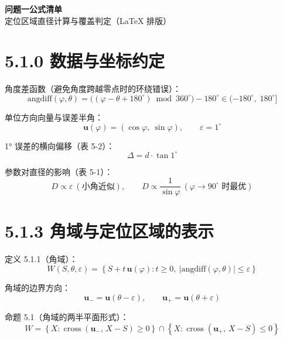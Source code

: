\documentclass[11pt]{ctexart}
\begin{document}
\begin{center}
{\LARGE\bfseries 问题一公式清单}\\[6pt]
{\normalsize 定位区域直径计算与覆盖判定（LaTeX 排版）}
\end{center}

\section*{5.1.0 数据与坐标约定}

角度差函数（避免角度跨越零点时的环绕错误）：
\begin{equation}
\mathrm{angdiff}(\varphi,\theta)
= \big((\varphi-\theta+180^\circ) \bmod 360^\circ\big) - 180^\circ
\in (-180^\circ,\; 180^\circ]
\end{equation}

单位方向向量与误差半角：
\begin{equation}
\mathbf{u}(\varphi) = (\cos\varphi,\ \sin\varphi), \qquad
\varepsilon = 1^\circ
\end{equation}

1° 误差的横向偏移（表 5-2）：
\begin{equation}
\Delta = d \cdot \tan 1^\circ
\end{equation}

参数对直径的影响（表 5-1）：
\begin{equation}
D \propto \varepsilon \ (\text{小角近似}), \qquad
D \propto \frac{1}{\sin\varphi} \ (\varphi \to 90^\circ \text{ 时最优})
\end{equation}

\section*{5.1.3 角域与定位区域的表示}

定义 5.1.1（角域）：
\begin{equation}
W(S,\theta,\varepsilon)
= \left\{ S + t\,\mathbf{u}(\varphi) : t \ge 0,\ \bigl|\mathrm{angdiff}(\varphi,\theta)\bigr| \le \varepsilon \right\}
\end{equation}

角域的边界方向：
\begin{equation}
\mathbf{u}_- = \mathbf{u}(\theta-\varepsilon), \qquad
\mathbf{u}_+ = \mathbf{u}(\theta+\varepsilon)
\end{equation}

命题 5.1（角域的两半平面形式）：
\begin{equation}
W = \left\{ X : \operatorname{cross}(\mathbf{u}_-,\, X-S) \ge 0 \right\}
\cap \left\{ X : \operatorname{cross}(\mathbf{u}_+,\, X-S) \le 0 \right\}
\end{equation}
\end{document}
